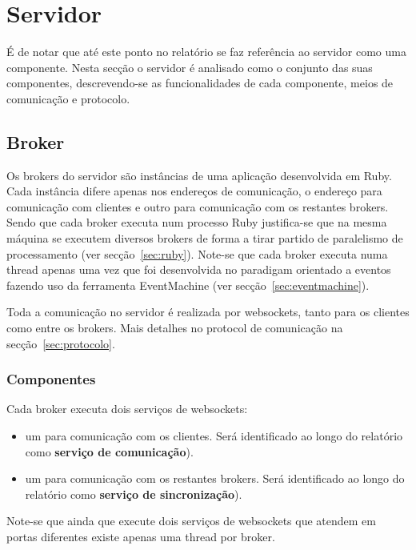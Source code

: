 \section{Servidor}

É de notar que até este ponto no relatório se faz referência ao servidor como uma componente.
Nesta secção o servidor é analisado como o conjunto das suas componentes, descrevendo-se as funcionalidades de cada componente, meios de comunicação e protocolo.

\subsection{Broker}

Os brokers do servidor são instâncias de uma aplicação desenvolvida em Ruby. Cada instância difere apenas nos endereços de comunicação, o endereço para comunicação com clientes e outro para comunicação com os restantes brokers.
Sendo que cada broker executa num processo Ruby justifica-se que na mesma máquina se executem diversos brokers de forma a tirar partido de paralelismo de processamento (ver secção~\ref{sec:ruby}).
Note-se que cada broker executa numa thread apenas uma vez que foi desenvolvida no paradigam orientado a eventos fazendo uso da ferramenta EventMachine (ver secção~\ref{sec:eventmachine}).

Toda a comunicação no servidor é realizada por websockets, tanto para os clientes como entre os brokers. Mais detalhes no protocol de comunicação na secção~\ref{sec:protocolo}.

\subsubsection{Componentes}
Cada broker executa dois serviços de websockets:

\begin{itemize}
\item um para comunicação com os clientes. Será identificado ao longo do relatório como \textbf{serviço de comunicação}).
\item um para comunicação com os restantes brokers. Será identificado ao longo do relatório como \textbf{serviço de sincronização}).
\end{itemize}

Note-se que ainda que execute dois serviços de websockets que atendem em portas diferentes existe apenas uma thread por broker.


